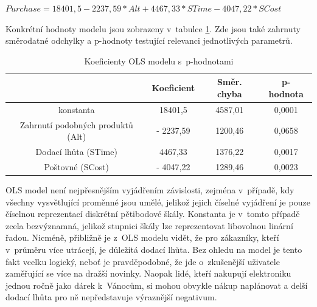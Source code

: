 \documentclass[12pt,oneside,openany]{fithesis}
\begin{document}
\begin{center}
$ Purchase = 18401,5 - 2237,59*Alt + 4467,33*STime - 4047,22*SCost $
\end{center}

Konkrétní hodnoty modelu jsou zobrazeny v~tabulce 
\hyperlink{tab-ols}{\ref{tab-ols}}.
Zde jsou také zahrnuty směrodatné odchylky a p-hodnoty testující relevanci jednotlivých parametrů.

            \begin{table}[htb]
                \begin{center}%
                    \begin{tabular}{|c|c|c|c|}
                        \hline 
                        {{}} & {{Koeficient}} & {{Směr. chyba}} & {{p-hodnota}} \tabularnewline
                         \hline 
                         {{konstanta}} & {{18401,5}} & {{4587,01}} & {{0,0001}} \tabularnewline
                          \hline 
                          {{Zahrnutí podobných produktů (Alt)}} & {{- 2237,59}} & {{1200,46}} & {{0,0658}} \tabularnewline
                           \hline 
                           {{Dodací lhůta (STime)}} & {{4467,33}} & {{1376,22}} & {{0,0017}} \tabularnewline
                            \hline 
                            {{Poštovné (SCost)}} & {{- 4047,22}} & {{1289,46}} & {{0,0023}} \tabularnewline
                            \hline 
                        \end{tabular}
                        \caption{Koeficienty OLS modelu s~p-hodnotami}\label{tab-ols}
                    \end{center}
                \end{table}

                OLS model není nejpřesnějším vyjádřením závislosti, 
zejména v~případě, kdy všechny vysvětlující proměnné jsou umělé, 
jelikož jejich číselné vyjádření je pouze číselnou reprezentací 
diskrétní pětibodové škály. Konstanta je v~tomto případě zcela 
bezvýznamná, jelikož stupnici škály lze reprezentovat libovolnou linární 
řadou. Nicméně, přibližně je z~OLS modelu vidět, že pro zákazníky, 
kteří v~průměru více utrácejí, je důležitá dodací lhůta. Bez ohledu 
na model je tento fakt vcelku logický, neboť je pravděpodobné, že jde 
o~zkušenější uživatele zaměřující se více na dražší novinky. 
Naopak lidé, kteří nakupují elektroniku jednou ročně jako dárek 
k~Vánocům, si mohou obvykle nákup naplánovat a delší dodací lhůta pro 
ně nepředstavuje výraznější negativum.
\end{document}
